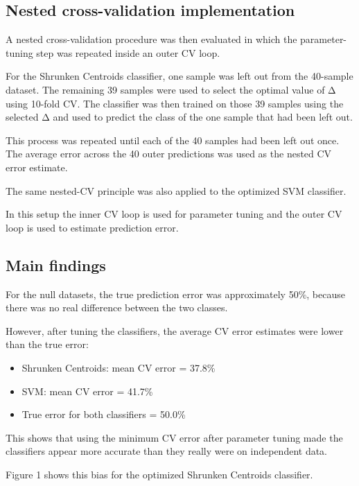 \documentclass[
  letterpaper,
  DIV=11,
  numbers=noendperiod]{scrreprt}
\providecommand{\tightlist}{%
  \setlength{\itemsep}{0pt}\setlength{\parskip}{0pt}}
\begin{document}
\subsection{Nested cross-validation
implementation}\label{nested-cross-validation-implementation}

A nested cross-validation procedure was then evaluated in which the
parameter-tuning step was repeated inside an outer CV loop.

For the Shrunken Centroids classifier, one sample was left out from the
40-sample dataset. The remaining 39 samples were used to select the
optimal value of Δ using 10-fold CV. The classifier was then trained on
those 39 samples using the selected Δ and used to predict the class of
the one sample that had been left out.

This process was repeated until each of the 40 samples had been left out
once. The average error across the 40 outer predictions was used as the
nested CV error estimate.

The same nested-CV principle was also applied to the optimized SVM
classifier.

In this setup the inner CV loop is used for parameter tuning and the
outer CV loop is used to estimate prediction error.

\subsection{Main findings}\label{main-findings}

For the null datasets, the true prediction error was approximately 50\%,
because there was no real difference between the two classes.

However, after tuning the classifiers, the average CV error estimates
were lower than the true error:

\begin{itemize}
\tightlist
\item
  Shrunken Centroids: mean CV error = 37.8\%
\item
  SVM: mean CV error = 41.7\%
\item
  True error for both classifiers = 50.0\%
\end{itemize}

This shows that using the minimum CV error after parameter tuning made
the classifiers appear more accurate than they really were on
independent data.

Figure 1 shows this bias for the optimized Shrunken Centroids
classifier.
\end{document}
